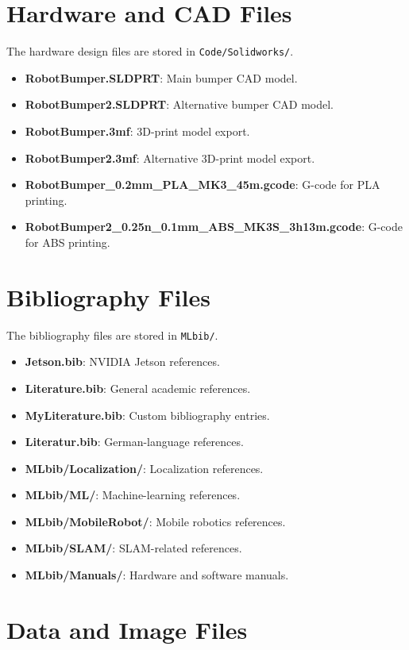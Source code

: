\section{Hardware and CAD Files}

The hardware design files are stored in \texttt{Code/Solidworks/}.

\begin{itemize}
	\item \textbf{RobotBumper.SLDPRT}: Main bumper CAD model.
	\item \textbf{RobotBumper2.SLDPRT}: Alternative bumper CAD model.
	\item \textbf{RobotBumper.3mf}: 3D-print model export.
	\item \textbf{RobotBumper2.3mf}: Alternative 3D-print model export.
	\item \textbf{RobotBumper\_0.2mm\_PLA\_MK3\_45m.gcode}: G-code for PLA printing.
	\item \textbf{RobotBumper2\_0.25n\_0.1mm\_ABS\_MK3S\_3h13m.gcode}: G-code for ABS printing.
\end{itemize}

\section{Bibliography Files}

The bibliography files are stored in \texttt{MLbib/}.

\begin{itemize}
	\item \textbf{Jetson.bib}: NVIDIA Jetson references.
	\item \textbf{Literature.bib}: General academic references.
	\item \textbf{MyLiterature.bib}: Custom bibliography entries.
	\item \textbf{Literatur.bib}: German-language references.
	\item \textbf{MLbib/Localization/}: Localization references.
	\item \textbf{MLbib/ML/}: Machine-learning references.
	\item \textbf{MLbib/MobileRobot/}: Mobile robotics references.
	\item \textbf{MLbib/SLAM/}: SLAM-related references.
	\item \textbf{MLbib/Manuals/}: Hardware and software manuals.
\end{itemize}

\section{Data and Image Files}

